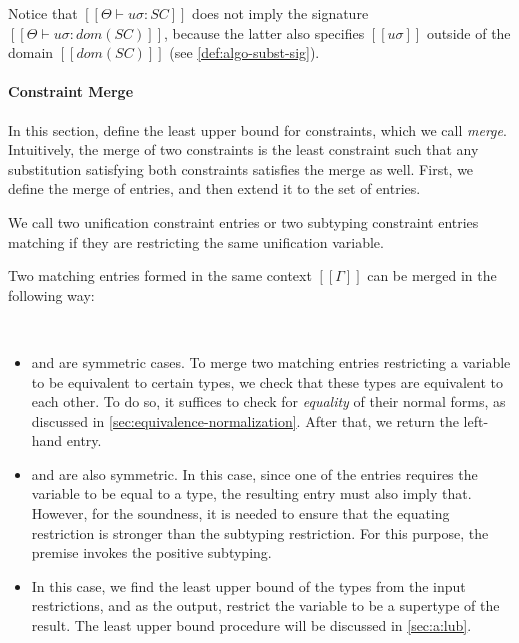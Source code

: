 Notice that $[[Θ ⊢ uσ : SC]]$ does not 
imply the signature $[[Θ ⊢ uσ : dom(SC)]]$, because 
the latter also specifies $[[uσ]]$ outside of the domain $[[dom(SC)]]$
(see \cref{def:algo-subst-sig}).


\paragraph{Constraint Merge}

In this section, define the least upper bound 
for constraints, which we call \emph{merge}.
Intuitively, the merge of two constraints is the least
constraint such that any substitution satisfying both constraints
satisfies the merge as well.
First, we define the merge of entries,
and then extend it to the set of entries.

\begin{definition} 
  We call two unification constraint entries 
  or two subtyping constraint entries matching 
  if they are restricting the same unification variable.
\end{definition}

Two matching entries formed in the same context $[[Γ]]$ 
can be merged in the following way:
\begin{algorithm}
  \label{definition:merge-matching-entries}
   \hfill 

  \ottdefnSCMELabeled[\apppref]\\
\end{algorithm}

\begin{itemize}
  \item {} and 
    are symmetric cases. To merge two matching entries restricting
    a variable to be equivalent to certain types, we check
    that these types are equivalent to each other.
    To do so, it suffices to check for \emph{equality} of their normal forms,
    as discussed in \cref{sec:equivalence-normalization}. 
    After that, we return the left-hand entry.

  \item {} and 
    are also symmetric. 
    In this case,
    since one of the entries requires the variable to be equal to 
    a type, the resulting entry must also imply that.
    However, for the soundness, it is needed to ensure that
    the equating restriction is stronger than the subtyping restriction.
    For this purpose, the premise invokes the positive subtyping.

  \item {} 
    In this case, we find the least upper bound of the types from the input
    restrictions, 
    and as the output, restrict the variable to be a supertype of the result.
    The least upper bound procedure will be discussed in \cref{sec:a:lub}.
\end{itemize}


